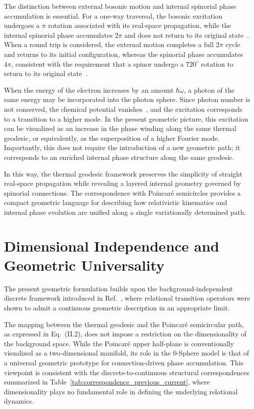 \documentclass[%
 reprint,
 amsmath,amssymb,
 aps,
 prb,
]{revtex4-2}
\numberwithin{equation}{section}
\begin{document}
The distinction between external bosonic motion and internal spinorial phase accumulation is essential. For a one-way traversal, the bosonic excitation undergoes a $\pi$ rotation associated with its real-space propagation, while the internal spinorial phase accumulates $2\pi$ and does not return to its original state~\cite{ballentine1998,shankar2016}. When a round trip is considered, the external motion completes a full $2\pi$ cycle and returns to its initial configuration, whereas the spinorial phase accumulates $4\pi$, consistent with the requirement that a spinor undergo a $720^\circ$ rotation to return to its original state~\cite{sakurai2017,dirac1928}.

When the energy of the electron increases by an amount $\hbar\omega$, a photon of the same energy may be incorporated into the photon sphere. Since photon number is not conserved, the chemical potential vanishes~\cite{hawking1975,unruh1976}, and the excitation corresponds to a transition to a higher mode. In the present geometric picture, this excitation can be visualized as an increase in the phase winding along the same thermal geodesic, or equivalently, as the superposition of a higher Fourier mode. Importantly, this does not require the introduction of a new geometric path; it corresponds to an enriched internal phase structure along the same geodesic.

In this way, the thermal geodesic framework preserves the simplicity of straight real-space propagation while revealing a layered internal geometry governed by spinorial connections. The correspondence with Poincaré semicircles provides a compact geometric language for describing how relativistic kinematics and internal phase evolution are unified along a single variationally determined path.


\section{Dimensional Independence and Geometric Universality}
\label{sec:dimensional_independence}

The present geometric formulation builds upon the background-independent discrete framework introduced in Ref.~\cite{hanamura17765336}, where relational transition operators were shown to admit a continuous geometric description in an appropriate limit.

The mapping between the thermal geodesic and the Poincaré semicircular path, as expressed in Eq.~(II.2), does not impose a restriction on the dimensionality of the background space. While the Poincaré upper half-plane is conventionally visualized as a two-dimensional manifold, its role in the 0-Sphere model is that of a universal geometric prototype for connection-driven phase accumulation. This viewpoint is consistent with the discrete-to-continuous structural correspondences summarized in Table~\ref{tab:correspondence_previous_current}, where dimensionality plays no fundamental role in defining the underlying relational dynamics.
\end{document}
